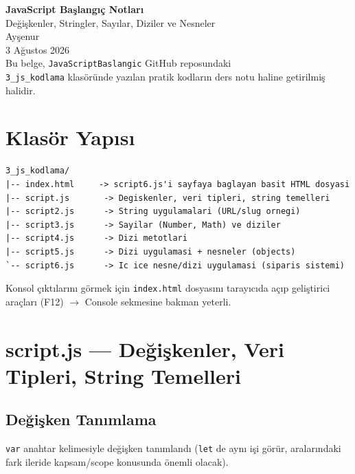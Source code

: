 \documentclass[11pt,a4paper]{article}
\begin{document}
\begin{titlepage}
\centering
\vspace*{3.5cm}
{\Huge\bfseries\color{titleblue} JavaScript Başlangıç Notları}\\[0.8cm]
{\Large Değişkenler, Stringler, Sayılar, Diziler ve Nesneler}\\[2.5cm]
{\large Ayşenur}\\[0.3cm]
{\large 3 Ağustos 2026}\\[3cm]
{\normalsize Bu belge, \texttt{JavaScriptBaslangic} GitHub reposundaki\\
\texttt{3\_js\_kodlama} klasöründe yazılan pratik kodların ders notu haline getirilmiş halidir.}
\vfill
\end{titlepage}

\tableofcontents
\newpage

\section*{Klasör Yapısı}

\begin{lstlisting}[language={},basicstyle=\ttfamily\small,frame=single,backgroundcolor=\color{codebg}]
3_js_kodlama/
|-- index.html     -> script6.js'i sayfaya baglayan basit HTML dosyasi
|-- script.js       -> Degiskenler, veri tipleri, string temelleri
|-- script2.js      -> String uygulamalari (URL/slug ornegi)
|-- script3.js      -> Sayilar (Number, Math) ve diziler
|-- script4.js      -> Dizi metotlari
|-- script5.js      -> Dizi uygulamasi + nesneler (objects)
`-- script6.js      -> Ic ice nesne/dizi uygulamasi (siparis sistemi)
\end{lstlisting}

Konsol çıktılarını görmek için \texttt{index.html} dosyasını tarayıcıda açıp geliştirici araçları (F12) $\rightarrow$ Console sekmesine bakman yeterli.

\newpage

\section{script.js --- Değişkenler, Veri Tipleri, String Temelleri}

\subsection*{Değişken Tanımlama}
\texttt{var} anahtar kelimesiyle değişken tanımlandı (\texttt{let} de aynı işi görür, aralarındaki fark ileride kapsam/scope konusunda önemli olacak).
\end{document}
